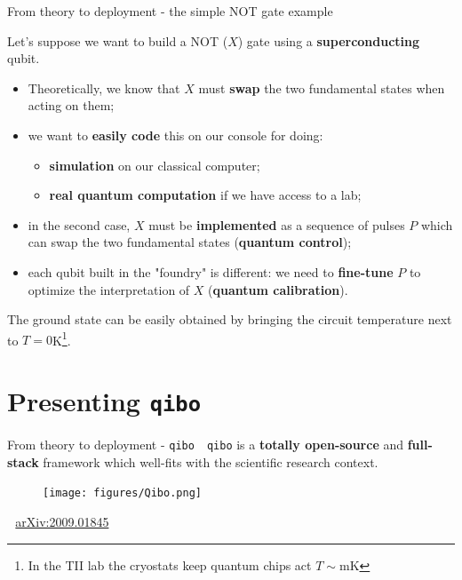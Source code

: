 \documentclass[8pt, xcolor={svgnames}, hyperref={colorlinks,linkcolor=black, citecolor=amethyst, urlcolor=amethyst}]{beamer}
\begin{document}
\begin{frame}{From theory to deployment - the simple NOT gate example}

\large

Let's suppose we want to build a NOT ($X$) gate using a \textbf{superconducting}
qubit. 
\vspace{0.3cm}
\pause 
\begin{itemize}
    \item[\faPencilSquareO] Theoretically, we know that $X$ must \textbf{swap} 
    the two fundamental states when acting on them;
    \pause
    \item[\faTerminal] we want to \textbf{easily code} this on our console for doing:
    \begin{itemize}
        \item[\tiny\faCircle] \textbf{simulation} on our classical computer;
        \item[\tiny\faCircle] \textbf{real quantum computation} if we have access to a lab; 
    \end{itemize}
    \pause
    \item[\faWrench] in the second case, $X$ must be \textbf{implemented} 
    as a sequence of pulses $P$ which can swap the two fundamental states 
    (\textbf{quantum control});
    \pause
    \item[\faSliders] each qubit built in the "foundry" is different: 
    we need to \textbf{fine-tune} $P$ to optimize the interpretation of $X$ 
    (\textbf{quantum calibration}).
\end{itemize}

\pause
\vspace{0.2cm}
\begin{tcolorbox}[colback=amethyst!30, title=Some more info]
  The ground state can be easily obtained by bringing the circuit
  temperature next to $T=0$K\footnote{In the TII lab the cryostats keep quantum chips act
  $T\sim$mK}.
\end{tcolorbox}
\end{frame}

\section{Presenting \texttt{qibo}}

\begin{frame}{From theory to deployment - \texttt{qibo}}
\large
\faArrowCircleRight\,\, \texttt{qibo} is a \textbf{totally open-source} and \textbf{full-stack} 
framework which well-fits with the scientific research context.
    \begin{figure}
    \centering 
    \texttt{[image: figures/Qibo.png]}
  \end{figure}
  \faBook\,\, \href{https://arxiv.org/abs/2009.01845}{arXiv:2009.01845}
\end{frame}
\end{document}
